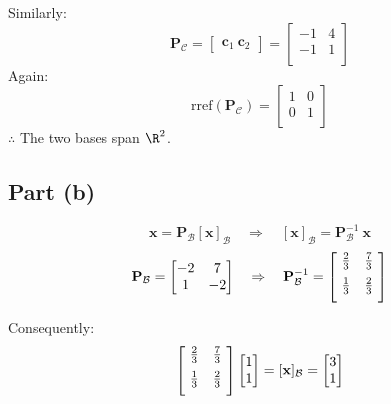 \documentclass{article}
\begin{document}
Similarly:
\[%
    \mathbf{P}_{\mathcal{C}} = 
    \begin{bmatrix}
        \mathbf{c}_{1} \ \mathbf{c}_{2} 
    \end{bmatrix}
    =
    \begin{bmatrix}
        -1 & 4 \\
        -1 & 1 \\
    \end{bmatrix}
\]%
Again:
\[%
    \text{rref} (\mathbf{\mathbf{P}_{\mathcal{C}}}) 
    =
    \begin{bmatrix}
        1 & 0 \\
        0 & 1 \\
    \end{bmatrix}
\]%
$ \therefore $ The two bases span $ \R^{2} $.

\subsection{Part (b)} 
\[%
    \mathbf{x}= \mathbf{P}_{\mathcal{B}}[\mathbf{x}]_{\mathcal{B}}
    \quad
    \Rightarrow 
    \quad
    [\mathbf{x}]_{\mathcal{B}} = \mathbf{P}_{\mathcal{B}}^{-1} \ \mathbf{x}
\]%
\[%
    \mathbf{P}_{\mathcal{B}} 
    = 
    \begin{bmatrix}
        -2 & 7 \\
        1 & -2 \\
    \end{bmatrix}
    \quad
    \Rightarrow 
    \quad
    \mathbf{P}_{\mathcal{B}}^{-1}
    = 
    \begin{bmatrix}
        \ \frac{2}{3}  & \frac{7}{3} \ \vspace{2mm} \\ \vspace{2mm}
		\ \frac{1}{3}  & \frac{2}{3} \  \\		
    \end{bmatrix}
\]%

Consequently:
\[%
    \begin{bmatrix}
        \ \frac{2}{3}  & \frac{7}{3} \ \vspace{2mm} \\ \vspace{2mm}
		\ \frac{1}{3}  & \frac{2}{3} \  \\		
    \end{bmatrix}
    \begin{bmatrix} 1 \\ 1 \\ \end{bmatrix}
    = 
    [\mathbf{x}]_{\mathcal{B}}
    =
    \begin{bmatrix} 3 \\ 1 \\ \end{bmatrix}
\]%
\end{document}
